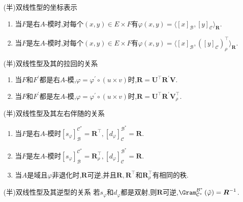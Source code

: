 \begin{proposition}{(半)双线性型的坐标表示}{}
	\begin{enumerate}
		\item 当$F$是右$A$-模时,对每个$\left(x,y\right)\in E\times F$有$\varphi\left(x,y\right)=\langle\left[x\right]_{\mathcal{B}},\left[y\right]_{\mathcal{C}}\rangle_{\boldsymbol{R}}$.
		\item 当$F$是左$A$-模时,对每个$\left(x,y\right)\in E\times F$有$\varphi\left(x,y\right)=\langle\left[x\right]_{\mathcal{B}},\left(\left[y\right]_{\mathcal{C}}\right)_{\rho}^{\top}\rangle_{\boldsymbol{R}}$.
	\end{enumerate}
\end{proposition}

\begin{proposition}{(半)双线性型及其的拉回的关系}{}
	\begin{enumerate}
		\item 当$F$和$F^{\prime}$都是右$A$-模,$\varphi=\varphi^{\prime}\circ\left(u\times v\right)$时,$\boldsymbol{R}=\boldsymbol{U}^{\top}\boldsymbol{R}^{\prime}\boldsymbol{V}$.
		\item 当$F$和$F^{\prime}$都是左$A$-模,$\varphi=\varphi^{\prime}\circ\left(u\times v\right)$时,$\boldsymbol{R}=\boldsymbol{U}^{\top}\boldsymbol{R}^{\prime}\boldsymbol{V}_{\rho}^{\top}$.
	\end{enumerate}
\end{proposition}

\begin{proposition}{(半)双线性型及其左右伴随的关系}{}
	\begin{enumerate}
		\item 当$F$是右$A$-模时$\left[s_{\varphi}\right]_{\mathcal{B}}^{\mathcal{C}^{\ast}}=\boldsymbol{R}^{\top},\left[d_{\varphi}\right]_{\mathcal{C}}^{\mathcal{B}^{\ast}}=\boldsymbol{R}$.
		\item 当$F$是左$A$-模时$\left[s_{\varphi}\right]_{\mathcal{B}}^{\mathcal{C}^{\ast}}=\boldsymbol{R}_{\rho}^{\top},\left[d_{\varphi}\right]_{\mathcal{C}}^{\mathcal{B}^{\ast}}=\boldsymbol{R}$.
		\item 当$A$是域且$\varphi$非退化时,$\boldsymbol{R}$可逆,并且$\boldsymbol{R},\boldsymbol{R}^{\top}$和$\boldsymbol{R}_{\rho}^{\top}$有相同的秩.
	\end{enumerate}
\end{proposition}

\begin{proposition}{(半)双线性型及其逆型的关系}{}
	若$s_{\varphi}$和$d_{\varphi}$都是双射,则$\boldsymbol{R}$可逆,$\Gram_{\mathcal{C}^{\ast}}^{\mathcal{B}^{\ast}}\left(\tilde{\varphi}\right)=\boldsymbol{R}^{-1}$.
\end{proposition}


